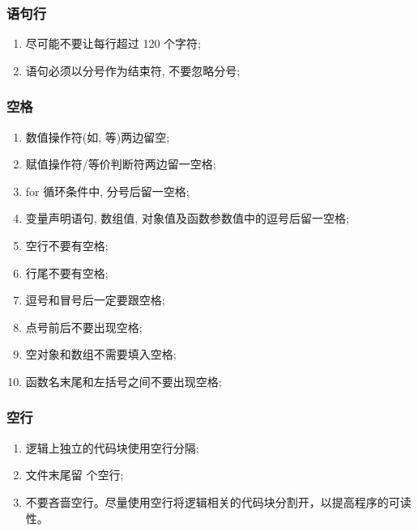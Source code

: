 \documentclass[letterpaper,10pt,english]{sphinxmanual}
\begin{document}
\subsubsection{语句行}
\label{styleguide/js-style-rules:id2}\begin{enumerate}
\item {}
尽可能不要让每行超过 120 个字符;

\item {}
语句必须以分号作为结束符, 不要忽略分号;

\end{enumerate}


\subsubsection{空格}
\label{styleguide/js-style-rules:id3}\begin{enumerate}
\item {}
数值操作符(如, \code{+/-/*/\%} 等)两边留空;

\item {}
赋值操作符/等价判断符两边留一空格;

\item {}
for 循环条件中, 分号后留一空格;

\item {}
变量声明语句, 数组值, 对象值及函数参数值中的逗号后留一空格;

\item {}
空行不要有空格;

\item {}
行尾不要有空格;

\item {}
逗号和冒号后一定要跟空格;

\item {}
点号前后不要出现空格;

\item {}
空对象和数组不需要填入空格;

\item {}
函数名末尾和左括号之间不要出现空格;

\end{enumerate}


\subsubsection{空行}
\label{styleguide/js-style-rules:id4}\begin{enumerate}
\item {}
逻辑上独立的代码块使用空行分隔;

\item {}
文件末尾留  个空行;

\item {}
不要吝啬空行。尽量使用空行将逻辑相关的代码块分割开，以提高程序的可读性。

\end{enumerate}
\end{document}
